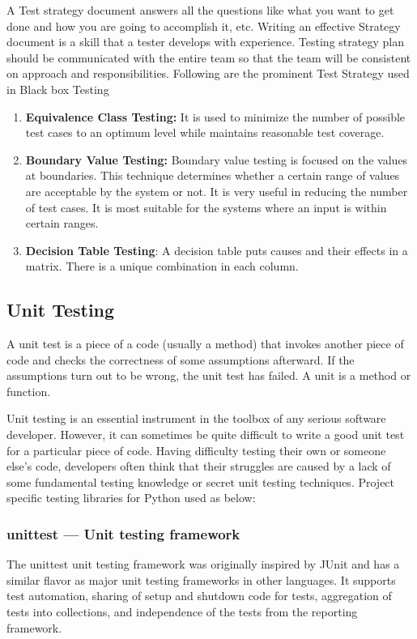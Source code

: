 \documentclass[12pt, a4paper]{report}
\begin{document}
A Test strategy document answers all the questions like what you want to get done and how you are going to accomplish it, etc. Writing an effective Strategy document is a skill that a tester develops with experience. Testing strategy plan should be communicated with the entire team so that the team will be consistent on approach and responsibilities.\newline
Following are the prominent Test Strategy used in Black box Testing
\begin{enumerate}
	\item \textbf{Equivalence Class Testing:} It is used to minimize the number of possible test cases to an optimum level while maintains reasonable test coverage.
	\item \textbf{Boundary Value Testing:} Boundary value testing is focused on the values at boundaries. This technique determines whether a certain range of values are acceptable by the system or not. It is very useful in reducing the number of test cases. It is most suitable for the systems where an input is within certain ranges.
	\item \textbf{Decision Table Testing}: A decision table puts causes and their effects in a matrix. There is a unique combination in each column.

\end{enumerate}

\newpage
\subsection{Unit Testing}
A unit test is a piece of a code (usually a method) that invokes another piece of code and checks the correctness of some assumptions afterward. If the assumptions turn out to be wrong, the unit test has failed. A unit is a method or function.

\par Unit testing is an essential instrument in the toolbox of any serious software developer. However, it can sometimes be quite difficult to write a good unit test for a particular piece of code. Having difficulty testing their own or someone else’s code, developers often think that their struggles are caused by a lack of some fundamental testing knowledge or secret unit testing techniques.
Project specific testing libraries for Python used as below:
\subsubsection{unittest — Unit testing framework}
The unittest unit testing framework was originally inspired by JUnit and has a similar flavor as major unit testing frameworks in other languages. It supports test automation, sharing of setup and shutdown code for tests, aggregation of tests into collections, and independence of the tests from the reporting framework.
\end{document}
